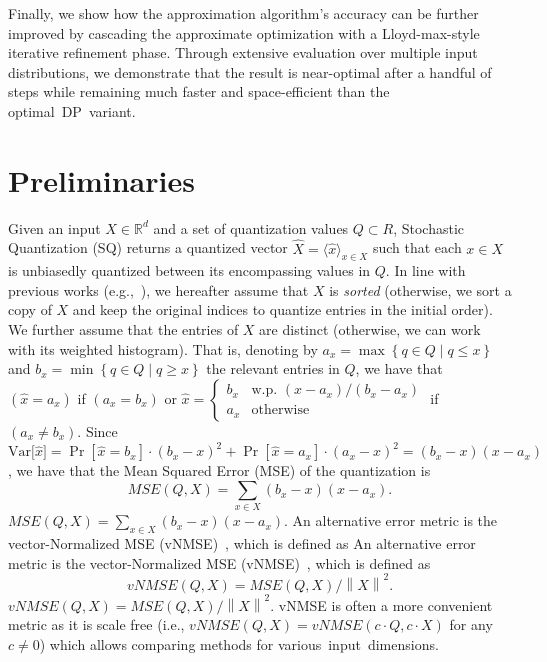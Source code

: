 \documentclass[11pt,letterpaper]{article}
\newcommand{\norm}[1]{\left\lVert#1\right\rVert}
\newcommand{\set}[1]{\left\{#1\right\}}
\newcommand{\Var}[1]{\mathrm{Var}{#1}}
\newcommand{\MM}[1]{\textcolor{purple}{MM:~#1}}
\newcommand{\MM}[1]{}
\begin{document}
Finally, we show how the approximation algorithm's accuracy can be further improved by cascading the approximate optimization with a Lloyd-max-style iterative refinement phase. 
Through extensive evaluation over multiple input distributions, we demonstrate that the result is near-optimal after a handful of steps while remaining much faster and space-efficient than the \mbox{optimal DP variant.}

\section{Preliminaries}\label{sec:preliminaries}
Given an input $X\in\mathbb R^d$ and a set of quantization values $Q\subset R$, Stochastic Quantization (SQ) returns a quantized vector $\widehat X = \langle\widehat x\rangle_{x\in X}$ such that each $x\in X$ is unbiasedly quantized between its encompassing values in $Q$. 
In line with previous works (e.g.,~\cite{ben2024optimal,zhang2017zipml,faghri2020adaptive}), we hereafter assume that $X$ is \emph{sorted} (otherwise, we sort a copy of $X$ and keep the original indices to quantize entries in the initial order). We further assume that the entries of $X$ are distinct (otherwise, we can work with its weighted histogram).
That is, denoting by $a_x=\max\set{q\in Q\mid q\le x}$ and $b_x=\min\set{q\in Q\mid q\ge x}$ the relevant entries in $Q$, we have that $(\widehat x=a_x)$ if $(a_x=b_x)$ or $\widehat x = \begin{cases}
    b_x & \mbox{w.p. $(x-a_x)/(b_x-a_x)$} \\ 
    a_x & \mbox{otherwise}
\end{cases}$ if $(a_x\neq b_x)$.
Since $\Var[\widehat x] = \Pr[\widehat x = b_x]\cdot (b_x-x)^2 + \Pr[\widehat x = a_x]\cdot (a_x-x)^2 = (b_x-x)(x-a_x)$, we have that the Mean Squared Error (MSE) of the quantization is 
\ifarxiv
\[
MSE(Q,X) = \sum_{x\in X}(b_x-x)(x-a_x).
\]
\else\mbox{$MSE(Q,X) = \sum_{x\in X}(b_x-x)(x-a_x).$}
\fi
\ifarxiv
An alternative error metric is the vector-Normalized MSE (vNMSE)~\cite{vargaftik2021drive,benbasat2026hadamard,benbasat2026turboquant}, which is defined as
\else
An alternative error metric is the vector-Normalized MSE (vNMSE)~\cite{vargaftik2021drive}, which is defined as
\fi
\ifarxiv
\[
    vNMSE(Q,X) = MSE(Q,X) / \norm{X}^2.
\]
\else
$
    vNMSE(Q,X) = MSE(Q,X) / \norm{X}^2.
$
\fi
vNMSE is often a more convenient metric as it is scale free (i.e., $vNMSE(Q,X)=vNMSE(c\cdot Q,c\cdot X)$ for any $c\neq 0$) which allows comparing methods for \mbox{various input dimensions.}
\end{document}
